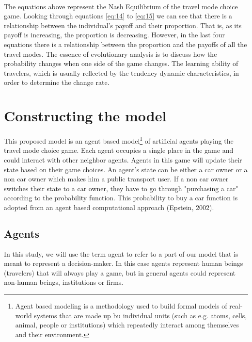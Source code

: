 \paragraph{}The equations above represent the Nash Equilibrium of the travel mode choice game. Looking through equations \ref{eq:14} to \ref{eq:15} we can see that there is a relationship between the individual's payoff and their proportion. That is, as its payoff is increasing, the proportion is decreasing. However, in the last four equations there is a relationship between the proportion and the payoffs of all the travel modes.
The essence of evolutionary analysis is to discuss how the probability changes when one side of the game changes. The learning ability of travelers, which is usually reflected by the tendency dynamic characteristics, in order to determine the change rate.
\section{Constructing the model}
This proposed model is an agent based model\footnote{Agent based modeling is a methodology used to build formal models of real-world systems that are made up bu individual units (such as e.g. atoms, cells, animal, people or institutions) which repeatedly interact among themselves and their environment.} of artificial agents playing the travel mode choice game. Each agent occupies a single place in the game and could interact with other neighbor agents. Agents in this game will update their state based on their game choices. An agent's state can be either a car owner or a non car owner which makes him a public transport user. If a non car owner switches their state to a car owner, they have to go through "purchasing a car" according to the probability function. This probability to buy a car function is adopted from an agent based computational approach (Epstein, 2002).

\subsection{Agents}
In this study, we will use the term agent to refer to a part of our model that is meant to represent a decision-maker. In this case agents represent human beings (travelers) that will always play a game, but in general agents could represent non-human beings, institutions or firms.
